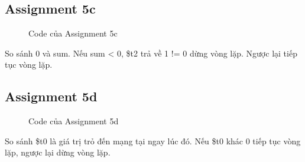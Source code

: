 \documentclass[a4paper,12pt]{article}
\begin{document}
\subsection{Assignment 5c}
\begin{figure}[!h]
	\centerline{}
	\caption{Code của Assignment 5c}
	\label{fig:ass5c}
\end{figure}
\noindent
So sánh 0 và sum. Nếu sum < 0, \$t2 trả về 1 != 0 dừng vòng lặp. Ngược lại tiếp tục vòng lặp. \\
\clearpage
\newpage
\subsection{Assignment 5d}
\begin{figure}[!h]
	\centerline{}
	\caption{Code của Assignment 5d}
	\label{fig:ass5d}
\end{figure}
\noindent
So sánh \$t0 là giá trị trỏ đến mạng tại ngay lúc đó. Nếu \$t0 khác 0 tiếp tục vòng lặp, ngược lại dừng vòng lặp. \\
\clearpage
\newpage
\end{document}
